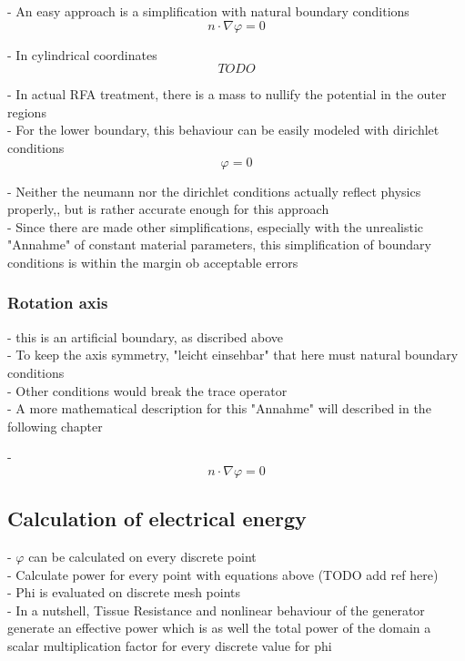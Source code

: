 \documentclass[parskip=half, titlepage=yes, 12pt, BCOR=12mm, DIV=calc]{scrartcl}
\begin{document}
- An easy approach is a simplification with natural boundary conditions \\

\begin{equation}
    n \cdot \nabla \varphi = 0
\end{equation}

- In cylindrical coordinates
\begin{equation}
    TODO
\end{equation}

- In actual RFA treatment, there is a mass to nullify the potential in the outer regions \\
- For the lower boundary, this behaviour can be easily modeled with dirichlet conditions \\
\begin{equation}
    \varphi = 0
\end{equation}

- Neither the neumann nor the dirichlet conditions actually reflect physics properly,, but is rather accurate enough for this approach \\
- Since there are made other simplifications, especially with the unrealistic "Annahme" of constant material parameters, this simplification of boundary conditions is within the margin ob acceptable errors


\subsubsection{Rotation axis}

- this is an artificial boundary, as discribed above \\
- To keep the axis symmetry, "leicht einsehbar" that here must natural boundary conditions \\
- Other conditions would break the trace operator \\
- A more mathematical description for this "Annahme" will described in the following chapter

- \begin{equation}
    n \cdot \nabla \varphi = 0
\end{equation}



\subsection{Calculation of electrical energy}

- $\varphi$ can be calculated on every discrete point \\
- Calculate power for every point with equations above (TODO add ref here) \\
- Phi is evaluated on discrete mesh points \\
- In a nutshell, Tissue Resistance and nonlinear behaviour of the generator generate an effective power which is as well the total power of the domain  a scalar multiplication factor for every discrete value for phi \\
\end{document}
